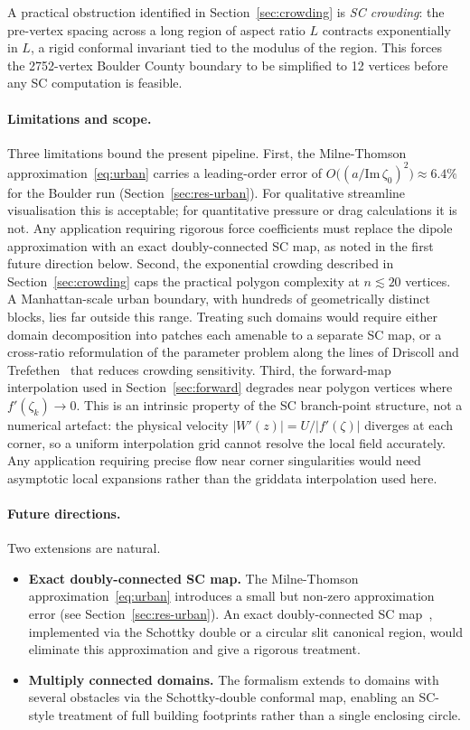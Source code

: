 \documentclass[11pt]{article}
\newcommand{\Imag}{\mathrm{Im}}
\begin{document}
A practical obstruction identified in Section~\ref{sec:crowding} is
\emph{SC crowding}: the pre-vertex spacing across a long region of aspect
ratio $L$ contracts exponentially in $L$, a rigid conformal invariant tied
to the modulus of the region. This forces the 2752-vertex Boulder County boundary
to be simplified to 12 vertices before any SC computation is feasible.

\paragraph{Limitations and scope.}
Three limitations bound the present pipeline. First, the Milne-Thomson
approximation~\eqref{eq:urban} carries a leading-order error of
$O\bigl((a/\Imag\,\zeta_0)^2\bigr) \approx 6.4\%$ for the Boulder run
(Section~\ref{sec:res-urban}). For qualitative streamline visualisation
this is acceptable; for quantitative pressure or drag calculations it is
not. Any application requiring rigorous force coefficients must replace
the dipole approximation with an exact doubly-connected SC map, as noted
in the first future direction below. Second, the exponential crowding
described in Section~\ref{sec:crowding} caps the practical polygon
complexity at $n \lesssim 20$ vertices. A Manhattan-scale urban boundary,
with hundreds of geometrically distinct blocks, lies far outside this
range. Treating such domains would require either domain decomposition
into patches each amenable to a separate SC map, or a cross-ratio
reformulation of the parameter problem along the lines of Driscoll and
Trefethen~\citep[Ch.~4]{DT02} that reduces crowding sensitivity. Third,
the forward-map interpolation used in Section~\ref{sec:forward} degrades
near polygon vertices where $f'(\zeta_k) \to 0$. This is an intrinsic
property of the SC branch-point structure, not a numerical artefact:
the physical velocity $|W'(z)| = U/|f'(\zeta)|$ diverges at each corner,
so a uniform interpolation grid cannot resolve the local field accurately.
Any application requiring precise flow near corner singularities would
need asymptotic local expansions rather than the griddata interpolation
used here.

\paragraph{Future directions.}
Two extensions are natural.

\begin{itemize}[leftmargin=2em]
\item \textbf{Exact doubly-connected SC map.} The Milne-Thomson
  approximation~\eqref{eq:urban} introduces a small but non-zero
  approximation error (see Section~\ref{sec:res-urban}). An exact
  doubly-connected SC map~\citep[Ch.~4, \S4.9]{DT02}, implemented via the
  Schottky double or a circular slit canonical region, would eliminate
  this approximation and give a rigorous treatment.

\item \textbf{Multiply connected domains.} The formalism extends to domains
  with several obstacles via the Schottky-double conformal map, enabling an
  SC-style treatment of full building footprints rather than a single
  enclosing circle.
\end{itemize}
\end{document}
